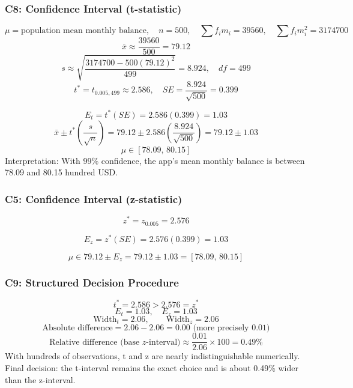 \begin{ExamProblems}
		\subsubsection*{C8: Confidence Interval (t-statistic)}
		\[
		\mu=\text{population mean monthly balance},\quad n=500,\quad \sum f_im_i=39560,\quad \sum f_im_i^2=3174700
		\]
		\[
		\bar{x}\approx\frac{39560}{500}=79.12
		\]
		\[
		s\approx\sqrt{\frac{3174700-500(79.12)^2}{499}}=8.924,\quad df=499
		\]
		\[
		t^*=t_{0.005,499}\approx 2.586,\quad SE=\frac{8.924}{\sqrt{500}}=0.399
		\]

		\[
		E_t=t^*(SE)=2.586(0.399)=1.03
		\]
		\[
		\bar{x}\pm t^*\left(\frac{s}{\sqrt{n}}\right)=79.12\pm 2.586\left(\frac{8.924}{\sqrt{500}}\right)=79.12\pm 1.03
		\]
		\[
		\mu\in[78.09,\,80.15]
		\]
		Interpretation: With 99\% confidence, the app's mean monthly balance is between 78.09 and 80.15 hundred USD.

		\subsubsection*{C5: Confidence Interval (z-statistic)}
		\[
		z^*=z_{0.005}=2.576
		\]

		\[
		E_z=z^*(SE)=2.576(0.399)=1.03
		\]

		\[
		\mu\in 79.12\pm E_z=79.12\pm 1.03=[78.09,\,80.15]
		\]

		\subsubsection*{C9: Structured Decision Procedure}
		\[
		t^*=2.586>2.576=z^*
		\]
		\[
		E_t=1.03,\quad E_z=1.03
		\]
		\[
		\text{Width}_t=2.06,\qquad \text{Width}_z=2.06
		\]
		\[
		\text{Absolute difference}=2.06-2.06=0.00\text{ (more precisely }0.01\text{)}
		\]
		\[
		\text{Relative difference (base }z\text{-interval)}\approx\frac{0.01}{2.06}\times 100=0.49\%
		\]
		With hundreds of observations, t and z are nearly indistinguishable numerically.
		Final decision: the t-interval remains the exact choice and is about 0.49\% wider than the z-interval.


\end{ExamProblems}
